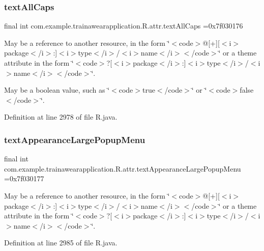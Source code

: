 \subsubsection{\texorpdfstring{textAllCaps}{textAllCaps}}
{\footnotesize\ttfamily final int com.\+example.\+trainawearapplication.\+R.\+attr.\+text\+All\+Caps =0x7f030176\hspace{0.3cm}{\ttfamily [static]}}

May be a reference to another resource, in the form \char`\"{}$<$code$>$@\mbox{[}+\mbox{]}\mbox{[}$<$i$>$package$<$/i$>$\+:\mbox{]}$<$i$>$type$<$/i$>$/$<$i$>$name$<$/i$>$$<$/code$>$\char`\"{} or a theme attribute in the form \char`\"{}$<$code$>$?\mbox{[}$<$i$>$package$<$/i$>$\+:\mbox{]}$<$i$>$type$<$/i$>$/$<$i$>$name$<$/i$>$$<$/code$>$\char`\"{}. 

May be a boolean value, such as \char`\"{}$<$code$>$true$<$/code$>$\char`\"{} or \char`\"{}$<$code$>$false$<$/code$>$\char`\"{}. 

Definition at line 2978 of file R.\+java.

\mbox{\label{classcom_1_1example_1_1trainawearapplication_1_1_r_1_1attr_aa937402e4ec73262dffec8b74443322a}} 
\subsubsection{\texorpdfstring{textAppearanceLargePopupMenu}{textAppearanceLargePopupMenu}}
{\footnotesize\ttfamily final int com.\+example.\+trainawearapplication.\+R.\+attr.\+text\+Appearance\+Large\+Popup\+Menu =0x7f030177\hspace{0.3cm}{\ttfamily [static]}}

May be a reference to another resource, in the form \char`\"{}$<$code$>$@\mbox{[}+\mbox{]}\mbox{[}$<$i$>$package$<$/i$>$\+:\mbox{]}$<$i$>$type$<$/i$>$/$<$i$>$name$<$/i$>$$<$/code$>$\char`\"{} or a theme attribute in the form \char`\"{}$<$code$>$?\mbox{[}$<$i$>$package$<$/i$>$\+:\mbox{]}$<$i$>$type$<$/i$>$/$<$i$>$name$<$/i$>$$<$/code$>$\char`\"{}. 

Definition at line 2985 of file R.\+java.

\mbox{\label{classcom_1_1example_1_1trainawearapplication_1_1_r_1_1attr_aca32edb54bde3b5d70be4efa1efc9392}} 
